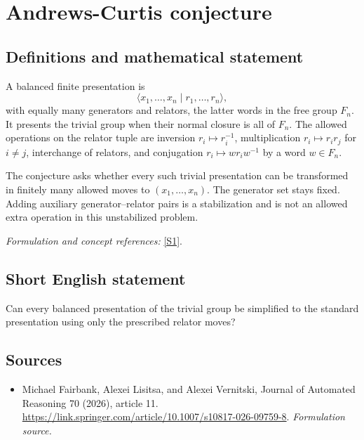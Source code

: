 \documentclass[11pt]{article}
\begin{document}
\section*{\texorpdfstring{Andrews-Curtis conjecture}{Andrews-Curtis conjecture}}\label{456}
\subsection{Definitions and mathematical statement}
A balanced finite presentation is
\[
 \langle x_1,\ldots,x_n\mid r_1,\ldots,r_n\rangle,
\]
with equally many generators and relators, the latter words in the free group $F_n$. It presents the trivial group when their normal closure is all of $F_n$. The allowed operations on the relator tuple are inversion $r_i\mapsto r_i^{-1}$, multiplication $r_i\mapsto r_ir_j$ for $i\ne j$, interchange of relators, and conjugation $r_i\mapsto w r_iw^{-1}$ by a word $w\in F_n$.

The conjecture asks whether every such trivial presentation can be transformed in finitely many allowed moves to $(x_1,\ldots,x_n)$. The generator set stays fixed. Adding auxiliary generator--relator pairs is a stabilization and is not an allowed extra operation in this unstabilized problem.
\par\smallskip\textit{Formulation and concept references:} \href{https://link.springer.com/article/10.1007/s10817-026-09759-8}{[S1]}.

\subsection{Short English statement}
Can every balanced presentation of the trivial group be simplified to the standard presentation using only the prescribed relator moves?
\subsection{Sources}
\begin{itemize}
\item[S1]Michael Fairbank, Alexei Lisitsa, and Alexei Vernitski, Journal of Automated Reasoning 70 (2026), article 11.
\url{https://link.springer.com/article/10.1007/s10817-026-09759-8}.
\textit{Formulation source.}
\end{itemize}
\end{document}
